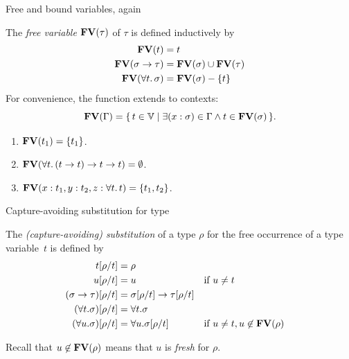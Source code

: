 \begin{frame}{Free and bound variables, again}
\begin{definition}
  The \emph{free variable} $\mathbf{FV}(\tau)$ of $\tau$ is defined inductively by
  \begin{align*}
    \mathbf{FV}(t) & {} = t \\
    \mathbf{FV}(\sigma \to \tau) & {} = \mathbf{FV}(\sigma) \cup \mathbf{FV}(\tau) \\
    \mathbf{FV}(\forall t.\, \sigma) & {} = \mathbf{FV}(\sigma) - \{t\}
  \end{align*}
  For convenience, the function extends to contexts:
  \[
    \mathbf{FV}(\Gamma) = \{\, t \in \mathbb{V}\mid \exists (x : \sigma) \in \Gamma
      \wedge t \in \mathbf{FV}(\sigma) \,\}.
  \]
\end{definition}
  \begin{enumerate}
    \item $\mathbf{FV}(t_1) = \{t_1\}$.
    \item $\mathbf{FV}(\forall t.\, (t \to t) \to t \to t) = \emptyset$.
    \item $\mathbf{FV}(x : t_1, y : t_2, z : \forall t.\,t)
      = \{t_1, t_2\}$.
  \end{enumerate}
\end{frame}
\begin{frame}{Capture-avoiding substitution for type}
  \begin{definition}
  The \emph{(capture-avoiding) substitution} of a type $\rho$ for the free
  occurrence of a type variable~$t$ is defined by 
  \begin{align*}
    t[{\rho}/{t}] & = \rho \\
    u[{\rho}/{t}] & = u && \text{if $u \neq t$}\\
    (\sigma\to\tau)[{\rho}/{t}] & =
    \sigma[{\rho}/{t}] \to
    \tau[{\rho}/{t}] \\
    (\forall t.\sigma)[{\rho}/{t}] & = \forall t.\sigma \\
    (\forall u.\sigma)[{\rho}/{t}] & = \forall u.\sigma[{\rho}/{t}]
                                      &&
    \text{if $u \neq t, u \not\in \mathbf{FV}(\rho)$} 
  \end{align*}
  \end{definition}
  Recall that $u \not\in \mathbf{FV}(\rho)$ means that $u$ is \emph{fresh} for $\rho$. 
\end{frame}

